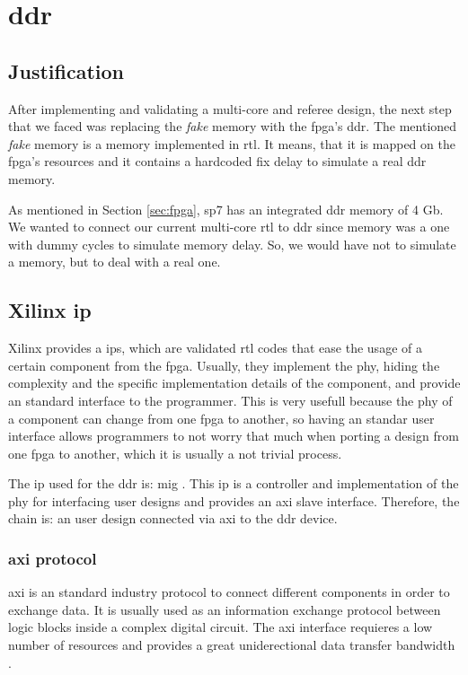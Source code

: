 \section{\acrshort{ddr}}
\subsection{Justification}
After implementing and validating a multi-core and referee design, the next step that we faced was replacing the \textit{fake} memory with the \gls{fpga}'s \gls{ddr}.
The mentioned \textit{fake} memory is a memory implemented in \gls{rtl}. It means, that it is mapped on the \gls{fpga}'s resources and it contains a hardcoded fix delay to simulate a real \gls{ddr} memory.

As mentioned in Section \ref{sec:fpga}, \gls{sp7} has an integrated \gls{ddr} memory of 4 Gb.
We wanted to connect our current multi-core \gls{rtl} to \gls{ddr} since memory was a one with dummy cycles to simulate memory delay. 
So, we would have not to simulate a memory, but to deal with a real one.


\subsection{Xilinx \acrshort{ip}}
Xilinx provides a \glspl{ip}, which are validated \gls{rtl} codes that ease the usage of a certain component from the \gls{fpga}. 
Usually, they implement the \gls{phy}, hiding the complexity and the specific implementation details of the component, and provide an standard interface to the programmer. 
This is very usefull because the \gls{phy} of a component can change from one \gls{fpga} to another, so having an standar user interface allows programmers to not worry that much when porting a design from one \gls{fpga} to another, which it is usually a not trivial process.

The \gls{ip} used for the \gls{ddr} is: \gls{mig} \cite{mig}.
This \gls{ip} is a controller and implementation of the \gls{phy} for interfacing user designs and provides an \gls{axi} slave interface.
Therefore, the chain is: an user design connected via \gls{axi} to the \gls{ddr} device.

\subsubsection{\acrshort{axi} protocol}
\acrlong{axi} is an standard industry protocol to connect different components in order to exchange data.
It is usually used as an information exchange protocol between logic blocks inside a complex digital circuit.
The \gls{axi} interface requieres a low number of resources and provides a great uniderectional data transfer bandwidth \cite{axi}.

